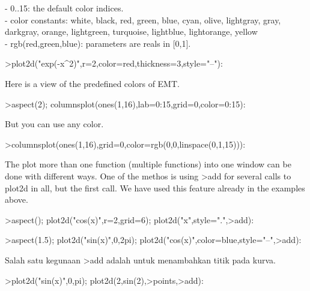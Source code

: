 \documentclass{article}
\begin{document}
\begin{eulernotebook}
\begin{eulercomment}
\begin{eulercomment}
\begin{eulercomment}
\begin{eulercomment}
\begin{eulercomment}
\begin{eulercomment}
\begin{eulercomment}
- 0..15: the default color indices.\\
- color constants: white, black, red, green, blue, cyan, olive,
lightgray, gray, darkgray, orange, lightgreen, turquoise, lightblue,
lightorange, yellow\\
- rgb(red,green,blue): parameters are reals in [0,1].
\end{eulercomment}
\begin{eulerprompt}
>plot2d("exp(-x^2)",r=2,color=red,thickness=3,style="--"):
\end{eulerprompt}
\begin{eulercomment}
Here is a view of the predefined colors of EMT.
\end{eulercomment}
\begin{eulerprompt}
>aspect(2); columnsplot(ones(1,16),lab=0:15,grid=0,color=0:15):
\end{eulerprompt}
\begin{eulercomment}
But you can use any color.
\end{eulercomment}
\begin{eulerprompt}
>columnsplot(ones(1,16),grid=0,color=rgb(0,0,linspace(0,1,15))):
\end{eulerprompt}
\begin{eulercomment}
The plot more than one function (multiple functions) into one window can be done with
different ways. One of the methos is using \textgreater{}add for several calls to plot2d in all, but
the first call. We have used this feature already in the examples above.
\end{eulercomment}
\begin{eulerprompt}
>aspect(); plot2d("cos(x)",r=2,grid=6); plot2d("x",style=".",>add):
\end{eulerprompt}
\begin{eulerprompt}
>aspect(1.5); plot2d("sin(x)",0,2pi); plot2d("cos(x)",color=blue,style="--",>add):
\end{eulerprompt}
\begin{eulercomment}
Salah satu kegunaan \textgreater{}add adalah untuk menambahkan titik pada kurva.
\end{eulercomment}
\begin{eulerprompt}
>plot2d("sin(x)",0,pi); plot2d(2,sin(2),>points,>add):

\end{eulerprompt}
\end{eulercomment}
\end{eulercomment}
\end{eulercomment}
\end{eulercomment}
\end{eulercomment}
\end{eulercomment}
\end{eulernotebook}
\end{document}
